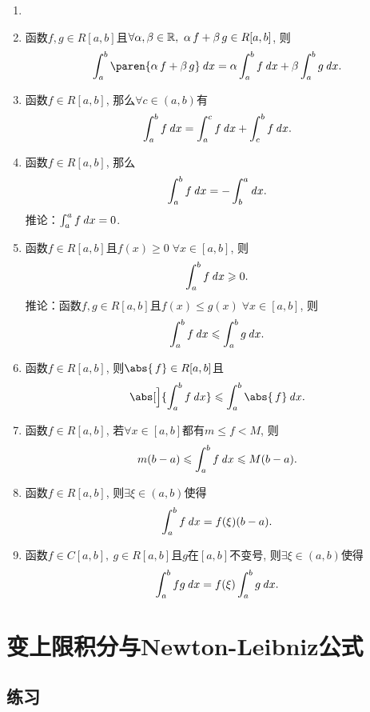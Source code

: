 \begin{theorem*}
  \begin{enumerate}
  \item[]
  \item 函数\(f, g \in R[a,b]\)且\(\forall \alpha, \beta \in \mathbb{R},\ \alpha\,f + \beta\,g \in R[a,b]\), 则
    \[
      \int_a^b \paren{\alpha\,f + \beta\,g} \dx
      = \alpha \int_a^b f \dx + \beta \int_a^b g \dx.
    \]

  \item 函数\(f \in R[a,b]\), 那么\(\forall c \in (a,b)\)有
    \[
      \int_a^b f \mathop{}\!\mathit{d} x = \int_a^c f \mathop{}\!\mathit{d} x + \int_c^b f \mathop{}\!\mathit{d} x.
    \]

  \item 函数\(f \in R[a,b]\), 那么
    \[
      \int_a^b f \mathop{}\!\mathit{d} x = - \int_b^a \mathop{}\!\mathit{d} x.
    \]
    推论：\(\int_a^a f \mathop{}\!\mathit{d} x = 0\).

  \item 函数\(f \in R[a,b]\)且\(f(x) \ge 0\; \forall x \in [a,b]\), 则
    \[
      \int_a^b f \dx \ge 0.
    \]
    推论：函数\(f, g \in R[a,b]\)且\(f(x) \le g(x)\; \forall x \in [a,b]\), 则
    \[
      \int_a^b f \dx \le \int_a^b g \dx.
    \]

  \item 函数\(f \in R[a,b]\), 则\(\abs{\,f} \in R[a,b]\)且
    \[
      \abs[\Big]{\int_a^b f \dx} \le \int_a^b \abs{\,f} \dx.
    \]

  \item 函数\(f \in R[a,b]\), 若\(\forall x \in [a,b]\)都有\(m \le f < M\), 则
    \[
      m(b-a) \le \int_a^b f \dx \le M(b-a).
    \]

  \item 函数\(f \in R[a,b]\), 则\(\exists \xi \in (a,b)\)使得
    \[
      \int_a^b f \mathop{}\!\mathit{d} x = f(\xi)(b-a).
    \]

  \item 函数\(f \in C[a,b],\ g \in R[a,b]\)且\(g\)在\([a,b]\)不变号, 则\(\exists \xi \in (a,b)\)使得
    \[
      \int_a^b fg \mathop{}\!\mathit{d} x = f(\xi) \int_a^b g \mathop{}\!\mathit{d} x.
    \]
  \end{enumerate}
\end{theorem*}

\section{变上限积分与Newton-Leibniz公式}

\ifshowex
{}
\subsection*{练习}

